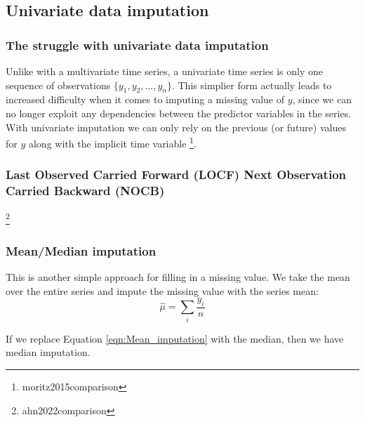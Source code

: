 \documentclass[
]{report}
\begin{document}

\subsection{Univariate data
imputation}\label{univariate-data-imputation}

\subsubsection{The struggle with univariate data
imputation}\label{the-struggle-with-univariate-data-imputation}

Unlike with a multivariate time series, a univariate time series is only
one sequence of observations \(\{y_1, y_2, ..., y_n\}\). This simplier
form actually leads to increased difficulty when it comes to imputing a
missing value of \(y\), since we can no longer exploit any dependencies
between the predictor variables in the series. With univariate
imputation we can only rely on the previous (or future) values for \(y\)
along with the implicit time variable \footnote{moritz2015comparison}.

\subsubsection{Last Observed Carried Forward (LOCF) Next Observation
Carried Backward
(NOCB)}\label{last-observed-carried-forward-locf-next-observation-carried-backward-nocb}

\footnote{ahn2022comparison}

\subsubsection{Mean/Median imputation}\label{meanmedian-imputation}

This is another simple approach for filling in a missing value. We take
the mean over the entire series and impute the missing value with the
series mean: \begin{equation}\label{eqn:Mean_imputation}
\hat{\mu} = \sum_i \frac{y_i}{n}
\end{equation}

If we replace Equation \ref{eqn:Mean_imputation} with the median, then
we have median imputation.

\end{document}

